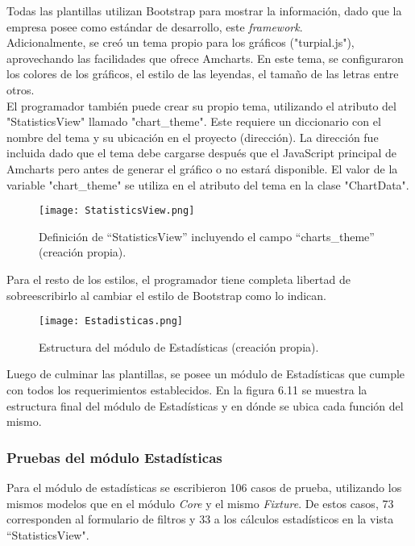 Todas las plantillas utilizan Bootstrap para mostrar la información, dado que la empresa posee como estándar de desarrollo, este \textit{framework}.\\

Adicionalmente, se creó un tema propio para los gráficos ("turpial.js"), aprovechando las facilidades que ofrece Amcharts. En este tema, se configuraron los colores de los gráficos, el estilo de las leyendas, el tamaño de las letras entre otros.\\

El programador también puede crear su propio tema, utilizando el atributo del "StatisticsView" llamado "chart\_theme". Este  requiere un diccionario con el nombre del tema y su ubicación en el proyecto (dirección). La dirección fue incluida dado que el tema debe cargarse después que el JavaScript principal de Amcharts pero antes de generar el gráfico o no estará disponible. El valor de la variable "chart\_theme" se utiliza en el atributo del tema en la clase "ChartData".\\


\begin{figure}[h]
\centering
\texttt{[image: StatisticsView.png]}
\caption{ Definición de “StatisticsView”  incluyendo el campo “charts\_theme” (creación propia).}
\label{fig:figura6.11}
\end{figure}


Para el resto de los estilos, el programador tiene completa libertad de sobreescribirlo al cambiar el estilo de Bootstrap como lo indican.\\


\begin{figure}[h]
\centering
\texttt{[image: Estadisticas.png]}
\caption{ Estructura del módulo de Estadísticas (creación propia).}
\label{fig:figura6.11}
\end{figure}

Luego de culminar las plantillas, se posee un módulo de Estadísticas que cumple con todos los requerimientos establecidos. En la figura 6.11 se muestra la estructura final del módulo de Estadísticas y en dónde se ubica cada función del mismo.

\subsubsection{Pruebas del módulo Estadísticas}

Para el módulo de estadísticas se escribieron 106 casos de prueba, utilizando los mismos modelos que en el módulo \textit{Core} y el mismo \textit{Fixture}. De estos casos, 73 corresponden al formulario de filtros y 33 a los cálculos estadísticos en la vista “StatisticsView". \\


